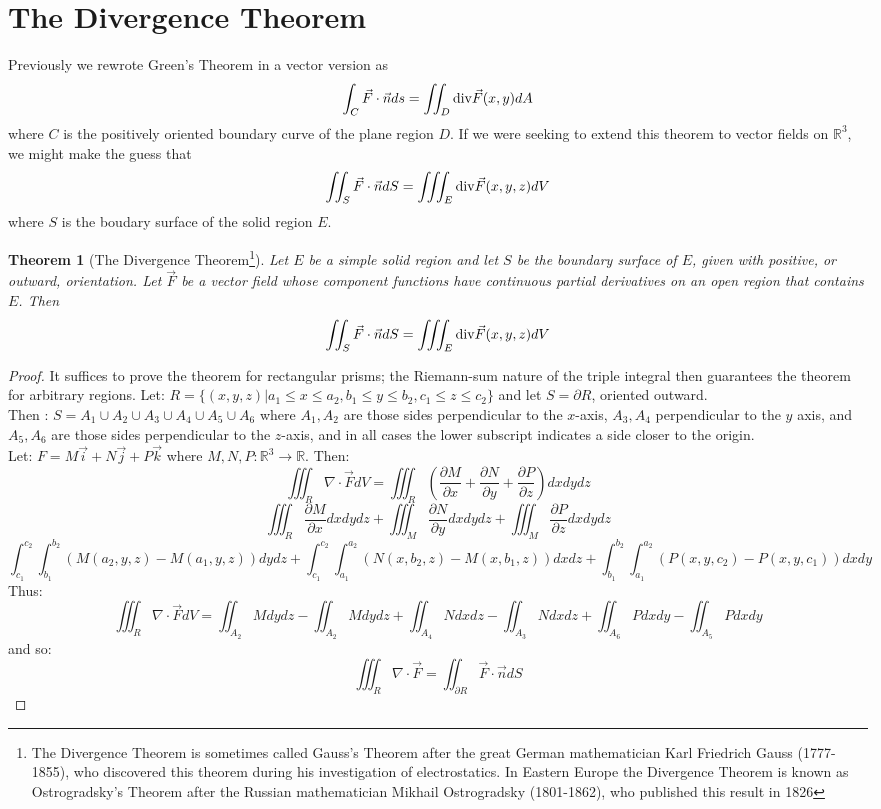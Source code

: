 \documentclass[10pt]{report}
\newtheorem{thm2}{Theorem}[section]
\newcommand{\grad}{\nabla}
\newcommand{\diverg}{\textup{div}}
\begin{document}
\section{The Divergence Theorem}
Previously we rewrote Green's Theorem in a vector version as
$$\int_C\vec{F}\cdot\vec{n}ds = \iint_D \diverg\vec{F}(x,y)dA$$
where $C$ is the positively oriented boundary curve of the plane region $D$. If we were seeking to extend this theorem to vector fields on $\mathbb{R}^3$, we might make the guess that
$$\iint_S\vec{F}\cdot \vec{n}dS = \iiint_E \diverg\vec{F}(x,y,z)dV$$
where $S$ is the boudary surface of the solid region $E$. 
\begin{thm2}[The Divergence Theorem\footnote{The Divergence Theorem is sometimes called Gauss's Theorem after the great German mathematician Karl Friedrich Gauss (1777-1855), who discovered this theorem during his investigation of electrostatics. In Eastern Europe the Divergence Theorem is known as Ostrogradsky's Theorem after the Russian mathematician Mikhail Ostrogradsky (1801-1862), who published this result in 1826}]
Let $E$ be a simple solid region and let $S$ be the boundary surface of $E$, given with positive, or outward, orientation. Let $\vec{F}$ be a vector field whose component functions have continuous partial derivatives on an open region that contains $E$. Then
$$\iint_S\vec{F}\cdot \vec{n}dS = \iiint_E \diverg\vec{F}(x,y,z)dV$$
\end{thm2}
\begin{proof}
It suffices to prove the theorem for rectangular prisms; the Riemann-sum nature of the triple integral then guarantees the theorem for arbitrary regions.
Let: $R=\{(x,y,z)|a_1\leq x\leq a_2,b_1\leq y\leq b_2,c_1\leq z\leq c_2\}$ and let $S=\partial R$, oriented outward.\\
Then : $S=A_1\cup A_2\cup A_3\cup A_4\cup A_5\cup A_6$ where $A_1,A_2$ are those sides perpendicular to the $x$-axis, $A_3,A_4$ perpendicular to the $y$ axis, and $A_5,A_6$ are those sides perpendicular to the $z$-axis, and in all cases the lower subscript indicates a side closer to the origin.\\
Let: $F=M\vec{i}+N\vec{j}+P\vec{k}$ where $M,N,P:\mathbb{R}^3\to\mathbb{R}$. Then:
$$\iiint_R\grad\cdot\vec{F}dV = \iiint_R\left( \frac{\partial M}{\partial x} +  \frac{\partial N}{\partial y} +  \frac{\partial P}{\partial z}\right)dxdydz$$
$$\iiint_R\frac{\partial M}{\partial x}dxdydz + \iiint_M\frac{\partial N}{\partial y}dxdydz + \iiint_M\frac{\partial P}{\partial z}dxdydz$$
$$\int_{c_1}^{c_2}\int_{b_1}^{b_2} (M(a_2,y,z)-M(a_1,y,z))dydz + \int_{c_1}^{c_2}\int_{a_1}^{a_2} (N(x,b_2,z)-M(x,b_1,z))dxdz + \int_{b_1}^{b_2}\int_{a_1}^{a_2} (P(x,y,c_2)-P(x,y,c_1))dxdy$$    
Thus:
$$\iiint_R\grad\cdot\vec{F}dV = \iint_{A_2}Mdydz-\iint_{A_2}Mdydz + \iint_{A_4}Ndxdz-\iint_{A_3}Ndxdz + \iint_{A_6}Pdxdy-\iint_{A_5}Pdxdy$$
and so:
$$\iiint_R\grad\cdot\vec{F} = \iint_{\partial R}\vec{F}\cdot\vec{n}dS$$
\end{proof}
\end{document}
